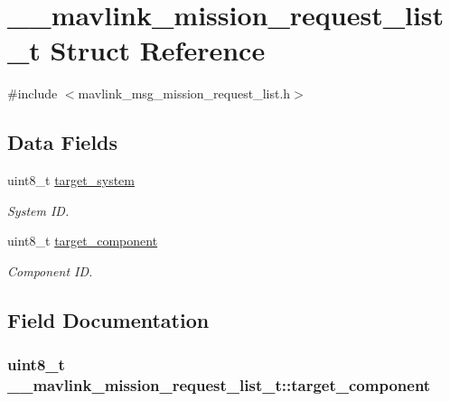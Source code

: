 \hypertarget{struct____mavlink__mission__request__list__t}{\section{\+\_\+\+\_\+mavlink\+\_\+mission\+\_\+request\+\_\+list\+\_\+t Struct Reference}
\label{struct____mavlink__mission__request__list__t}
}


{\ttfamily \#include $<$mavlink\+\_\+msg\+\_\+mission\+\_\+request\+\_\+list.\+h$>$}

\subsection*{Data Fields}
\begin{DoxyCompactItemize}
\item 
uint8\+\_\+t \hyperlink{struct____mavlink__mission__request__list__t_ae8b0c8bffa1ecde59f37cdf8b65f47d4}{target\+\_\+system}
\begin{DoxyCompactList}\small\item\em System I\+D. \end{DoxyCompactList}\item 
uint8\+\_\+t \hyperlink{struct____mavlink__mission__request__list__t_a8214615734dcc050fdcd5ccaad31b550}{target\+\_\+component}
\begin{DoxyCompactList}\small\item\em Component I\+D. \end{DoxyCompactList}\end{DoxyCompactItemize}


\subsection{Field Documentation}
\hypertarget{struct____mavlink__mission__request__list__t_a8214615734dcc050fdcd5ccaad31b550}{
\subsubsection[{target\+\_\+component}]{\setlength{\rightskip}{0pt plus 5cm}uint8\+\_\+t \+\_\+\+\_\+mavlink\+\_\+mission\+\_\+request\+\_\+list\+\_\+t\+::target\+\_\+component}}\label{struct____mavlink__mission__request__list__t_a8214615734dcc050fdcd5ccaad31b550}


